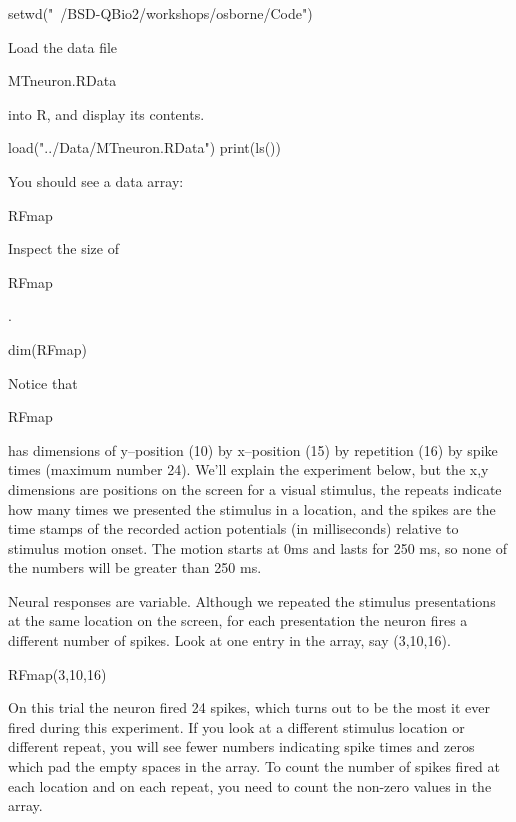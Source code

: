 \documentclass[
letterpaper, %
11pt, %
 oneside, 
onecolumn, %
]{memoir}
\numberwithin{Exercise}{chapter}
\begin{document}
\begin{shortrcode}
setwd("~/BSD-QBio2/workshops/osborne/Code")
\end{shortrcode}   

Load the data file \begin{ttfamily}MTneuron.RData\end{ttfamily}  into R, and display its contents. 


\begin{shortrcode}
load("../Data/MTneuron.RData")
print(ls())
\end{shortrcode}   



You should see a data array:  

\begin{hint}
		RFmap
\end{hint}  

 

Inspect the size of \begin{ttfamily}RFmap\end{ttfamily}. 


\begin{shortrcode}
dim(RFmap)
\end{shortrcode}

Notice that \begin{ttfamily}RFmap\end{ttfamily} has dimensions of y--position (10) by x--position (15) by repetition (16) by spike times (maximum number 24).  We'll explain the experiment below, but the x,y dimensions are positions on the screen for a visual stimulus, the repeats indicate how many times we presented the stimulus in a location, and the spikes are the time stamps of the recorded action potentials (in milliseconds) relative to stimulus motion onset.   The motion starts at 0ms and lasts for 250 ms, so none of the numbers will be greater than 250 ms. 

Neural responses are variable.  Although we repeated the stimulus presentations at the same location on the screen, for each presentation the neuron fires a different number of spikes.    Look at one entry in the array, say (3,10,16).    

\begin{shortrcode}
RFmap(3,10,16)
\end{shortrcode}

On this trial the neuron fired 24 spikes, which turns out to be the most it ever fired during this experiment.    If you look at a different stimulus location or different repeat, you will see fewer numbers indicating spike times and zeros which pad the empty spaces in the array.  To count the number of spikes fired at each location and on each repeat, you need to count the non-zero values in the array.
\end{document}
